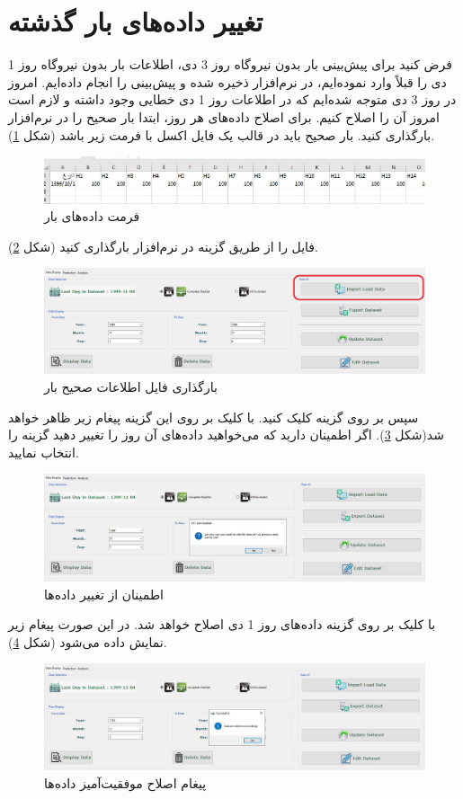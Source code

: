 \documentclass[a4paper,20pt,dvipsnames, usenames]{extbook}
\begin{document}
\section{تغییر داده‌های بار گذشته}
فرض کنید برای پیش‌بینی بار بدون نیروگاه روز 3 دی، اطلاعات بار بدون نیروگاه روز 1 دی را قبلاً وارد نموده‌ایم، در نرم‌افزار ذخیره شده و پیش‌بینی را انجام داده‌ایم. امروز در روز 3 دی متوجه شده‌ایم که در اطلاعات روز 1 دی خطایی وجود داشته و لازم است امروز آن را اصلاح کنیم. برای اصلاح داده‌های هر روز، ابتدا بار صحیح را در نرم‌افزار بارگذاری کنید. بار صحیح باید در قالب یک فایل اکسل با فرمت زیر باشد (شکل
\ref{fig8}).
\begin{figure}[!h]
	\centering
	\includegraphics[width = \textwidth]{fig21}
	\caption{فرمت داده‌های بار}
	\label{fig8}
\end{figure}
فایل را از طریق گزینه
در نرم‌افزار بارگذاری کنید (شکل
\ref{fig9}).
\begin{figure}[!h]
	\centering
	\includegraphics[width = \textwidth]{fig22}
	\caption{بارگذاری فایل اطلاعات صحیح بار}
	\label{fig9}
\end{figure}
سپس بر روی گزینه
کلیک کنید. با کلیک بر روی این گزینه پیغام زیر ظاهر خواهد شد(شکل
\ref{fig10}). اگر اطمینان دارید که می‌خواهید داده‌های آن روز را تغییر دهید گزینه 
را انتخاب نمایید.
\begin{figure}[!h]
	\centering
	\includegraphics[width = \textwidth]{fig23}
	\caption{اطمینان از تغییر داده‌ها}
	\label{fig10}
\end{figure}
با کلیک بر روی گزینه 
داده‌های روز 1 دی اصلاح خواهد شد. در این صورت پیغام زیر نمایش داده می‌شود (شکل
\ref{fig11}).
\begin{figure}[!h]
	\centering
	\includegraphics[width = \textwidth]{fig24}
	\caption{پیغام اصلاح موفقیت‌آمیز داده‌ها}
	\label{fig11}
\end{figure}
\end{document}
